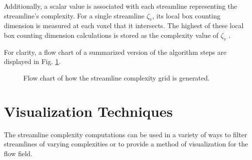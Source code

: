 \documentclass{egpubl}
\begin{document}
Additionally, a scalar value is associated with each streamline representing the streamline's complexity.
For a single streamline $\zeta_v$, its local box counting dimension is measured at each voxel that it intersects.
The highest of these local box counting dimension calculations is stored as the complexity value of $\zeta_v$ .

For clarity, a flow chart of a summarized version of the algorithm steps are displayed in Fig. \ref{fig:algorithm_flowchart}.

\begin{figure}
    \caption{Flow chart of how the streamline complexity grid is generated.}
    \label{fig:algorithm_flowchart}
\end{figure}

\section{Visualization Techniques} \label{sec:vt}

The streamline complexity computations can be used in a variety of ways to filter streamlines of varying complexities or to provide a method of visualization for the flow field.
\end{document}
